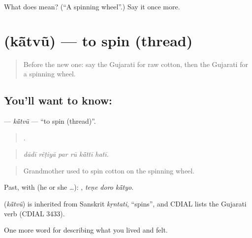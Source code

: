 \begin{tcolorbox}[breakable,colback=teal!4,colframe=teal!35!black,title={Before you move on}]
What does  mean? (\textquotedblleft{}A spinning wheel\textquotedblright{}.) Say it once more.
\end{tcolorbox}
\section[\texorpdfstring{\gu{કાંતવું} (kā̃tvũ)}{કાંતવું (kā̃tvũ)}]{ (kā̃tvũ) — to spin (thread)}

\label{lesson:GU-C505-katvu}



\begin{quote}
Before the new one: say the Gujarati for raw cotton, then the Gujarati for a spinning wheel.
\end{quote}

\subsection*{You'll want to know: }
\textbf{} — \emph{kā̃tvũ} — \textquotedblleft{}to spin (thread)\textquotedblright{}.

\begin{quote}
     .
\end{quote}

\begin{quote}
\emph{dādī rẽṭiyā par rū kā̃ttī hatī.}
\end{quote}

\begin{quote}
Grandmother used to spin cotton on the spinning wheel.
\end{quote}

Past, with  (he or she …):   , \emph{teṇe doro kā̃tyo}.

\begin{cousinweb}
\textbf{} (\emph{kā̃tvũ}) is inherited from Sanskrit \emph{kṛntati}, \textquotedblleft{}spins\textquotedblright{}, and CDIAL lists the Gujarati verb (CDIAL 3433).
\end{cousinweb}

\begin{grammarlens}[title={What you've built}]
One more word for describing what you lived and felt.
\end{grammarlens}

